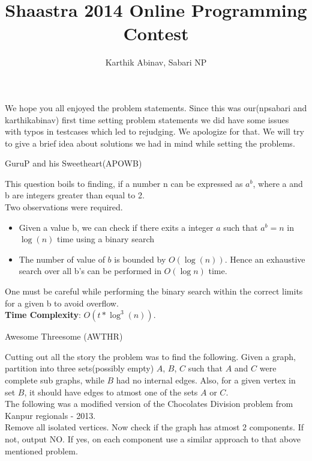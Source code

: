 \documentclass[solution,addpoints,12pt]{exam}
\title{Shaastra 2014 Online Programming Contest}
\author{Karthik Abinav, Sabari NP}
\begin{document}
\maketitle
\noindent

We hope you all enjoyed the problem statements. Since this was our(npsabari and karthikabinav) first time setting problem statements
we did have some issues with typos in testcases which led to rejudging. We apologize for that. We will try to give a brief idea about
solutions we had in mind while setting the problems. \\

\begin{questions}
\question
GuruP and his Sweetheart(APOWB)

\begin{solution}
 This question boils to finding, if a number n can be expressed as $a^b$, where a and b are integers greater than equal to 2. \\
 Two observations were required.
 \begin{itemize}
  \item 
    Given a value b, we can check if there exits a integer $a$ such that $a^b = n$ in $\log (n)$ time using a binary search
  \item
    The number of value of $b$ is bounded by $O(\log (n))$. Hence an exhaustive search over all b's can be performed in $O(\log n)$ time.
 \end{itemize}
  One must be careful while performing the binary search within the correct limits for a given b to avoid overflow. \\
  
  \textbf{Time Complexity}: $O(t \ast \log^3(n))$.\\
 


\end{solution}

\question
  Awesome Threesome (AWTHR)

\begin{solution}
  Cutting out all the story the problem was to find the following. Given a graph, partition into three sets(possibly empty) $A$, $B$, $C$ such that
  $A$ and $C$ were complete sub graphs, while $B$ had no internal edges. Also, for a given vertex in set $B$, it should have edges to atmost one of 
  the sets $A$ or $C$. \\
  
  The following was a modified version of the Chocolates Division problem from Kanpur regionals - 2013. \\
  Remove all isolated vertices. Now check if the graph has atmost 2 components. If not, output NO. If yes,
  on each component use a similar approach to that above mentioned problem. \\
  

\end{solution}
\end{questions}
\end{document}
